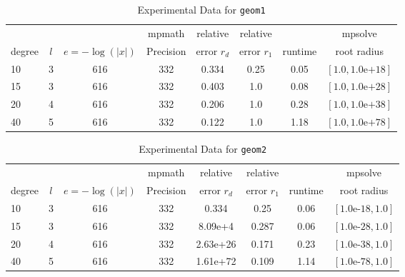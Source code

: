 \documentclass[sigconf]{acmart}
\begin{document}
\begin{table}[t]
\caption{Experimental Data for \texttt{geom1}} %
\label{tab:geom1}
\vskip -0.15in
\begin{center}
\begin{small}
\begin{sc}
\begin{tabular}{lccccccc}
\toprule
&  &  & mpmath & relative  & relative &  & mpsolve \\
degree  & $l$& $e=-\log(|x|)$& Precision &error $r_d$       & error $r_1$ &runtime& root radius\\
\midrule
 10 & 3 & 616 & 332 & 0.334 & 0.25 & 0.05 & $[1.0, 1.0\text{e+}18]$\\
 15 & 3 & 616 & 332 & 0.403 & 1.0 & 0.08 & $[1.0, 1.0\text{e+}28]$\\
 20 & 4 & 616 & 332 & 0.206 & 1.0 & 0.28 & $[1.0, 1.0\text{e+}38]$\\
 40 & 5 & 616 & 332 & 0.122 & 1.0 & 1.18 & $[1.0, 1.0\text{e+}78]$\\
\bottomrule
\end{tabular}
\end{sc}
\end{small}
\end{center}
\vskip 0.05in
\end{table}

\begin{table}[t]
\caption{Experimental Data for \texttt{geom2}} %
\label{tab:geom2}
\vskip -0.15in
\begin{center}
\begin{small}
\begin{sc}
\begin{tabular}{lccccccc}
\toprule
&  &  & mpmath & relative  & relative &  & mpsolve \\
degree  & $l$& $e=-\log(|x|)$& Precision &error $r_d$       & error $r_1$ &runtime& root radius\\
\midrule
 10 & 3 & 616 & 332 & 0.334 & 0.25 & 0.06 & $[1.0\text{e-}18, 1.0]$\\
 15 & 3 & 616 & 332 & 8.09e+4 & 0.287 & 0.06 & $[1.0\text{e-}28, 1.0]$\\
 20 & 4 & 616 & 332 & 2.63e+26 & 0.171 & 0.23 & $[1.0\text{e-}38, 1.0]$\\
 40 & 5 & 616 & 332 & 1.61e+72 & 0.109 & 1.14 & $[1.0\text{e-}78, 1.0]$\\
\bottomrule
\end{tabular}
\end{sc}
\end{small}
\end{center}
\vskip 0.05in
\end{table}
\end{document}
